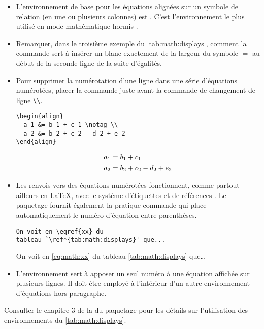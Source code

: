\begin{itemize}
\item L'environnement de base pour les équations alignées sur un
  symbole de relation (en une ou plusieurs colonnes) est .
  C'est l'environnement le plus utilisé en mode mathématique hormis
  .
\item Remarquer, dans le troisième exemple du
  \autoref{tab:math:displays}, comment la commande \cmd{\phantom} sert
  à insérer un blanc exactement de la largeur du symbole $=$ au début
  de la seconde ligne de la suite d'égalités.
\item Pour supprimer la numérotation d'une ligne dans une série
  d'équations numérotées, placer la commande \cmd{\notag} juste avant
  la commande de changement de ligne \verb=\\=.
  \begin{demo}
    \begin{texample}
\begin{lstlisting}
\begin{align}
  a_1 &= b_1 + c_1 \notag \\
  a_2 &= b_2 + c_2 - d_2 + e_2
\end{align}
\end{lstlisting}
      \producing
      \begin{align}
        a_1& =b_1+c_1 \notag \\
        a_2& =b_2+c_2-d_2+e_2
      \end{align}
    \end{texample}
  \end{demo}
\item Les renvois vers des équations numérotées fonctionnent, comme
  partout ailleurs en {\LaTeX}, avec le système d'étiquettes et de
  références \citep{UL:latex:1,sec:tableaux:floats}. Le paquetage
   fournit également la pratique commande \cmd{\eqref}
  qui place automatiquement le numéro d'équation entre parenthèses.
  \begin{demo}
    \begin{texample}
\begin{lstlisting}
On voit en \eqref{xx} du
tableau `\ref*{tab:math:displays}' que...
\end{lstlisting}
      \producing
      On voit en \eqref{eq:math:xx} du tableau
      \ref*{tab:math:displays} que\dots
    \end{texample}
  \end{demo}
\item L'environnement  sert à apposer un seul numéro à une
  équation affichée sur plusieurs lignes. Il doit être employé à
  l'intérieur d'un autre environnement d'équations hors paragraphe.
\end{itemize}
Consulter le chapitre 3 de la %
du paquetage  pour les détails sur
l'utilisation des environnements du \autoref*{tab:math:displays}.

